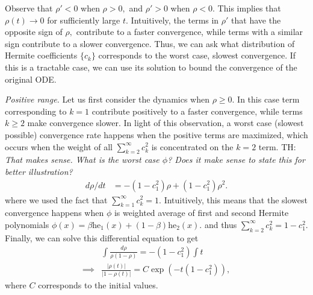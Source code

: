 \documentclass[twoside]{article}
\newcommand{\he}{\mathrm{he}}
\theoremstyle{definition}
\newcommand{\thomas}[1]{{\color{blue}TH:  \textit{#1}}}
\begin{document}
Observe that $\rho'<0$ when $\rho>0,$ and $\rho'>0$ when $\rho<0.$ This implies that $\rho(t) \to 0$ for sufficiently large $t.$ Intuitively, the terms in $\rho'$ that have the opposite sign of $\rho,$ contribute to a faster convergence, while terms with a similar sign contribute to a slower convergence. Thus, we can ask what distribution of Hermite coefficients $\{c_k\}$ corresponds to the worst case, slowest convergence. If this is a tractable case, we can use its solution to bound the convergence of the original ODE. 

\textit{Positive range.}
Let us first consider the dynamics when $\rho\ge 0.$ 
In this case term corresponding to $k=1$ contribute positively to a faster convergence, while terms $k\ge 2$ make convergence slower. In light of this observation, a worst case (slowest possible) convergence rate happens when the positive terms are maximized, which occurs when the weight of all $\sum_{k=2}^\infty c_k^2 $ is concentrated on the $k=2$ term. \thomas{That makes sense. What is the worst case $\phi$? Does it make sense to state this for better illustration?}
\begin{align*}
    d\rho/dt &=  -(1-c_1^2)\rho + (1-c_1^2) \rho^2.
\end{align*}
where we used the fact that $\sum_{k=1}^\infty c_k^2 = 1.$ Intuitively, this means that the slowest convergence happens when $\phi$ is weighted average of first and second Hermite polynomials $\phi(x) = \beta \he_1 (x) + (1-\beta) \he_2 (x).$
and thus $\sum_{k=2}^\infty c_k^2 = 1-c_1^2. $ Finally, we can solve this differential equation to get
\begin{align*}
    &\int \frac{d\rho}{\rho(1-\rho)} = - (1-c_1^2)\int t \\
    \implies &\frac{|\rho(t)|}{|1-\rho(t)|} = C \exp(-t(1-c_1^2)),
\end{align*}
where $C$ corresponds to the initial values. 
\end{document}
